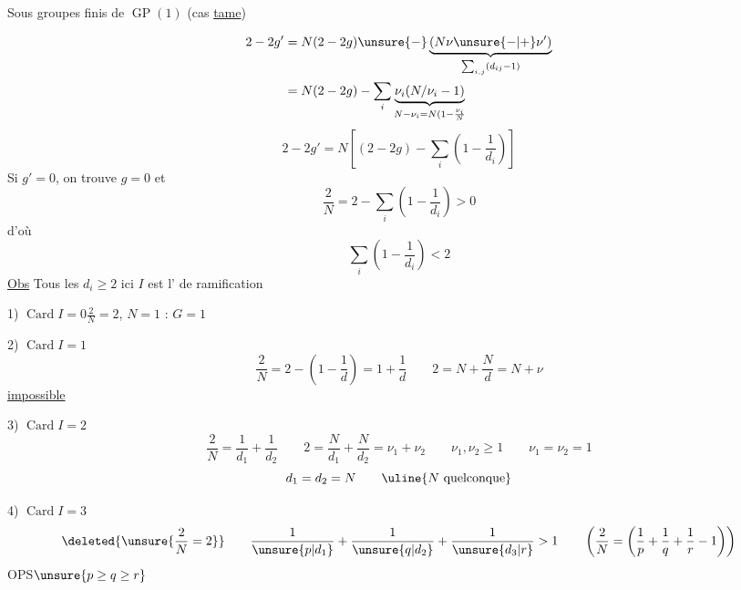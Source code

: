 Sous groupes finis de
$\operatorname{GP}(1)$ (cas \uline{tame})

\[
\begin{aligned}
2-2g'&=N(2-2g)\unsure{-}\underbrace{(N\nu\unsure{-|+}\nu')}_{\sum_{i,j}(d_{ij}-1)}\\
&=N(2-2g)-\sum_i\underbrace{\nu_i(N/\nu_i-1)}_{N-\nu_i=N(1-\frac{\nu_i}{N}}
\end{aligned}
\]
\qquad{}
\[
\boxed{2-2g'=N\left[(2-2g)-\sum_i\left(1-\frac1{d_i}\right)\right]}
\]
Si $g'=0$, on trouve $g=0$ et
\[
\boxed{\frac2N=2-\sum_i\left(1-\frac1{d_i}\right)>0}
\]
d'où
\[\sum_i\left(1-\frac1{d_i}\right)<2\]
\uline{Obs} Tous les $d_i\ge2$  ici $I$ est \uline{} l' de ramification

1) $\operatorname{Card}I=0$\qquad $\frac2N=2$, $N=1$ :  $G=1$

2) $\operatorname{Card}I=1$
\[
\frac2N=2-\left(1-\frac1d\right)=1+\frac1d\qquad
2=N+\frac Nd=N+\nu
\]
\uline{impossible}

3) $\operatorname{Card}I=2$
\[
\frac2N=\frac1{d_1}+\frac1{d_2}\qquad
2=\frac N{d_1}+\frac N{d_2}=\nu_1+\nu_2\qquad
\nu_1,\nu_2\ge1\qquad\nu_1=\nu_2=1
\]
\[d_1=d_2=N\qquad\uline{N\text{ quelconque}}\]

4) $\operatorname{Card}I=3$
\[
\deleted{\unsure{\frac2N=2}}\qquad
\frac1{\unsure{p|d_1}}+\frac1{\unsure{q|d_2}}+\frac1{\unsure{d_3|r}}>1
\qquad\left(\frac2N=\left(\frac1p+\frac1q+\frac1r-1\right)\right)
\]
OPS\qquad $\unsure{p\ge q\ge r}$

